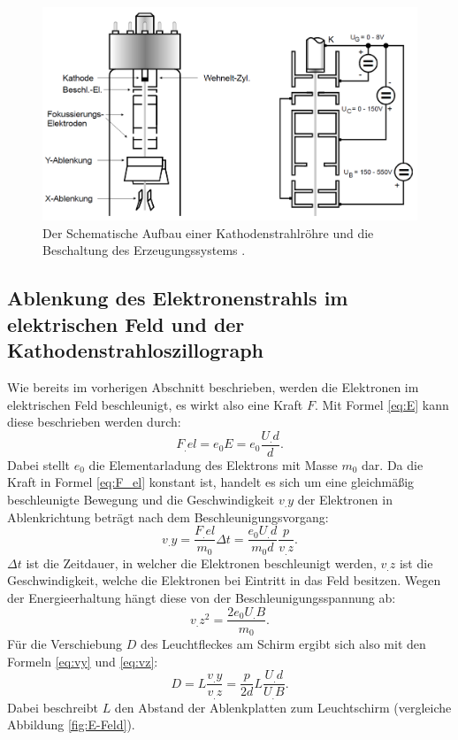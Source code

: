 \begin{figure}
\centering
\includegraphics[width=\linewidth-50pt,height=\textheight-50pt,keepaspectratio]{content/images/Kathodenstrahlroehre.jpg}
\caption{Der Schematische Aufbau einer Kathodenstrahlröhre und die Beschaltung des Erzeugungssystems \cite{V501}.}
\label{fig:Kathodenstrahlröhre}
\end{figure}

\subsection{Ablenkung des Elektronenstrahls im elektrischen Feld und der Kathodenstrahloszillograph}

Wie bereits im vorherigen Abschnitt beschrieben, werden die Elektronen im elektrischen Feld beschleunigt, es wirkt also eine Kraft $F$. Mit Formel \eqref{eq:E} kann diese beschrieben werden durch:
\begin{equation}
F_.{el} = e_0E = e_0\frac{U_.d}{d}\text{.}\label{eq:F_el}
\end{equation}  
Dabei stellt $e_0$ die Elementarladung des Elektrons mit Masse $m_0$ dar. Da die Kraft in Formel \eqref{eq:F_el} konstant ist, handelt es sich um eine gleichmäßig beschleunigte Bewegung und die Geschwindigkeit $v_.y$ der Elektronen in Ablenkrichtung beträgt nach dem Beschleunigungsvorgang:
\begin{equation}
v_.y = \frac{F_.{el}}{m_0}\Delta t = \frac{e_0U_.d}{m_0d}\frac{p}{v_.z}\text{.}\label{eq:vy}
\end{equation}
$\Delta t$ ist die Zeitdauer, in welcher die Elektronen beschleunigt werden, $v_.z$ ist die Geschwindigkeit, welche die Elektronen bei Eintritt in das Feld besitzen. Wegen der Energieerhaltung hängt diese von der Beschleunigungsspannung ab:
\begin{equation}
v_.z^2 = \frac{2e_0U_.B}{m_0}\text{.}\label{eq:vz}
\end{equation}
Für die Verschiebung $D$ des Leuchtfleckes am Schirm ergibt sich also mit den Formeln \eqref{eq:vy} und \eqref{eq:vz}:
\begin{equation}
D = L\frac{v_.y}{v_.z} = \frac{p}{2d}L\frac{U_.d}{U_.B}\text{.}\label{eq:D}
\end{equation}   
Dabei beschreibt $L$ den Abstand der Ablenkplatten zum Leuchtschirm (vergleiche Abbildung \ref{fig:E-Feld}).

